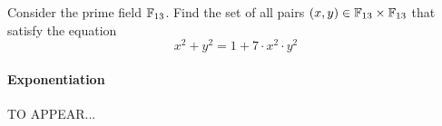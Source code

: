 \begin{exercise} Consider the prime field $\mathbb{F}_{13}$. Find the set of all pairs $(x,y)\in \mathbb{F}_{13}\times \mathbb{F}_{13}$ that satisfy the equation
$$
x^2+y^2 = 1 + 7\cdot x^2\cdot y^2
$$
\end{exercise}
%

\paragraph{Exponentiation} TO APPEAR...
